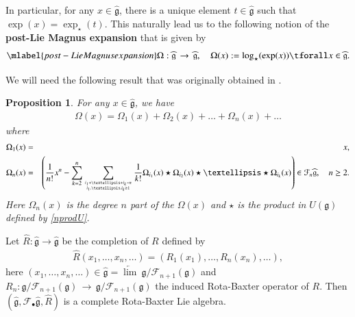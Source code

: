 \documentclass[12pt]{amsart}
\newtheorem{pro}[thm]{Proposition}
\theoremstyle{definition}   %
\newcommand{\lon }{\,\rightarrow\,}
\newcommand{\g}{\mathfrak g}
\newcommand{\huaR}{\mathcal{R}}
\newcommand{\huaF}{\mathcal{F}}
\begin{document}
In particular, for any $x\in \widehat{\g}$, there is a unique element $t\in \widehat{\g}$ such that $\exp(x)=\exp_{\star}(t)$. This naturally lead us to the following notion
of the {\bf post-Lie Magnus expansion}   that is given by
\begin{eqnarray}\mlabel{post-Lie Magnus expansion}
 \Omega:\widehat{\g}\lon \widehat{\g}, \quad \Omega(x):=\log_{\star}(\exp(x)) \tforall x\in \widehat{\g}.
\end{eqnarray}

We will need the following result that was originally obtained in \cite[Theorem 17]{EMM}.
\begin{pro}\label{Magnus}
    For any $x\in \widehat{\g}$, we have
\begin{eqnarray}
\Omega(x)=\Omega_1(x)+\Omega_2(x)+\ldots+\Omega_n(x)+\ldots
\end{eqnarray}
where
\begin{eqnarray}
\nonumber \Omega_1(x)&=&x,\\
\Omega_n(x)&=&\left(\frac{1}{n!}x^n-\sum\limits_{k=2}^{n}\sum\limits_{i_1+\ldots+i_k=n\atop i_1,\dots,i_k\ge 1}\frac{1}{k!}\Omega_{i_1}(x)\star \Omega_{i_2}(x)\star \ldots\star \Omega_{i_k}(x)\right)\in \huaF_n\widehat{\g},\quad n\geq 2.\label{form}
\end{eqnarray}
Here  $\Omega_n(x)$ is the degree $n$ part of the $\Omega(x)$ and $\star $ is the product in ${U}(\g)$ defined by \eqref{nprodU}.
\end{pro}

 Let $\widehat{R}:\widehat{\g}\rightarrow\widehat{\g}$ be the completion of $R$ defined by
\begin{eqnarray}\label{completion-RBA}
\widehat{R}(x_1,\ldots,x_n,\ldots)=(R_1(x_1),\ldots,R_n(x_n),\ldots),
    \end{eqnarray}
here $(x_1,\ldots,x_n,\ldots)\in \widehat{\g}=\underleftarrow{\lim}\ \g/\huaF_{n+1} (\g)$ and $R_n:\g/\huaF_{n+1} (\g)\lon \g/\huaF_{n+1} (\g)$ the induced Rota-Baxter operator of $R$. Then $(\widehat{\g}, \huaF_{\bullet}\widehat{\g} , \widehat{R})$ is a complete Rota-Baxter Lie algebra.


\end{document}
